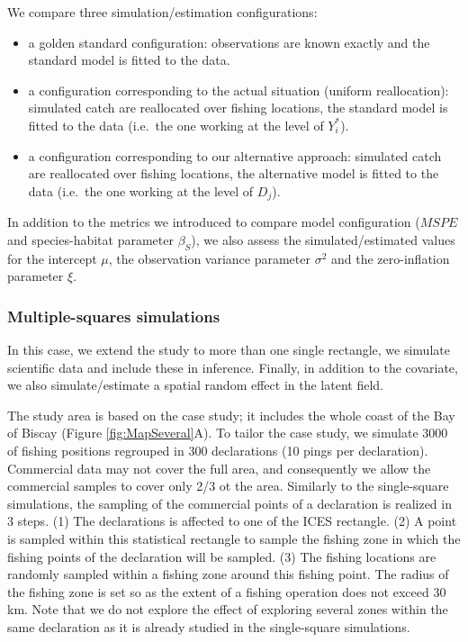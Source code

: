 \documentclass[
  english,
  man]{apa6}
\begin{document}
We compare three simulation/estimation configurations:

\begin{itemize}
\item
  a golden standard configuration: observations are known exactly and the standard model is fitted to the data.
\item
  a configuration corresponding to the actual situation (uniform reallocation): simulated catch are reallocated over fishing locations, the standard model is fitted to the data (i.e.~the one working at the level of \(Y_i^*\)).
\item
  a configuration corresponding to our alternative approach: simulated catch are reallocated over fishing locations, the alternative model is fitted to the data (i.e.~the one working at the level of \(D_j\)).
\end{itemize}

In addition to the metrics we introduced to compare model configuration (\(MSPE\) and species-habitat parameter \(\beta_S\)), we also assess the simulated/estimated values for the intercept \(\mu\), the observation variance parameter \(\sigma^2\) and the zero-inflation parameter \(\xi\).

\hypertarget{multiple-squares-simulations}{%
\subsubsection{Multiple-squares simulations}\label{multiple-squares-simulations}}

In this case, we extend the study to more than one single rectangle, we simulate scientific data and include these in inference. Finally, in addition to the covariate, we also simulate/estimate a spatial random effect in the latent field.

The study area is based on the case study; it includes the whole coast of the Bay of Biscay (Figure \ref{fig:MapSeveral}A). To tailor the case study, we simulate 3000 of fishing positions regrouped in 300 declarations (10 pings per declaration). Commercial data may not cover the full area, and consequently we allow the commercial samples to cover only 2/3 ot the area. Similarly to the single-square simulations, the sampling of the commercial points of a declaration is realized in 3 steps. (1) The declarations is affected to one of the ICES rectangle. (2) A point is sampled within this statistical rectangle to sample the fishing zone in which the fishing points of the declaration will be sampled. (3) The fishing locations are randomly sampled within a fishing zone around this fishing point. The radius of the fishing zone is set so as the extent of a fishing operation does not exceed 30 km. Note that we do not explore the effect of exploring several zones within the same declaration as it is already studied in the single-square simulations.
\end{document}
